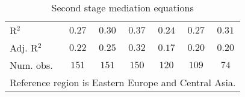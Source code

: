 \begin{sidewaystable}[H]
\begin{center}
{\begin{tabular}{l c c c c c c}
\hline
R$^2$                            & $0.27$       & $0.30$       & $0.37$          & $0.24$      & $0.27$       & $0.31$      \\
Adj. R$^2$                       & $0.22$       & $0.25$       & $0.32$          & $0.17$      & $0.20$       & $0.20$      \\
Num. obs.                        & $151$        & $151$        & $150$           & $120$       & $109$        & $74$        \\
\hline
\multicolumn{7}{l}{\scriptsize{Reference region is Eastern Europe and Central Asia.}}
\end{tabular}
}
\caption{Second stage mediation equations}
\label{MediationTable2}
\end{center}
\end{sidewaystable}
